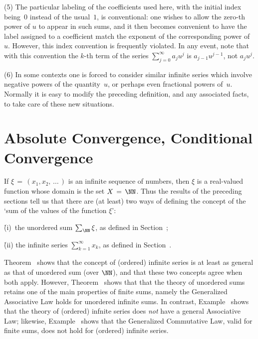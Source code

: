 \V

        (5) The particular labeling of the coefficients used here, with the initial index being~$0$ instead of the usual~$1$,
    is conventional: one wishes to allow the zero-th power of $u$ to appear in such sums,
    and it then becomes convenient to have the label assigned to a coefficient match the exponent of the corresponding power of~$u$.
    However, this index convention is frequently violated. In any event, note that with this convention the $k$-th term of the series $\sum_{j=0}^{{\infty}} a_{j}u^{j}$ is $a_{j-1}u^{j-1}$, not $a_{j}u^{j}$.

\V

        (6) In some contexts one is forced to consider similar infinite series which involve negative powers of the quantity~$u$,
    or perhaps even fractional powers of~$u$. Normally it is easy to modify the preceding definition, and any associated facts, to take care of these new situations.

\V
\V






                \section{{\bf Absolute Convergence, Conditional Convergence}}
                \label{SectG40}

\V

        If ${\xi} \,=\, (x_{1},x_{2},\,{\ldots}\,)$ is an infinite sequence of numbers,
    then ${\xi}$ is a real-valued function whose domain is the set $X \,=\, {\NN}$.
    Thus the results of the preceding sections tell us that there are (at least) two ways of defining the concept of the `sum of the values of the function ${\xi}$':

        \h (i)\, the unordered sum $\sum_{{\NN}} {\xi}$, as defined in Section~;

        \h (ii) the infinite series $\sum_{k=1}^{{\infty}} x_{k}$, as defined in Section~.

\noindent Theorem~ shows that the concept of (ordered) infinite series is at least as general as that of unordered sum (over ${\NN}$),
    and that these two concepts agree when both apply.
    However, Theorem~ shows that that the theory of unordered sums retains one of the main properties of finite sums,
    namely the Generalized Associative Law holds for unordered infinite sums.
    In contrast, Example~ shows that the theory of (ordered) infnite series does {\em not} have a general Associative Law;
    likewise, Example~ shows that the Generalized Commutative Law, valid for finite sums, does not hold for (ordered) infinite series.

